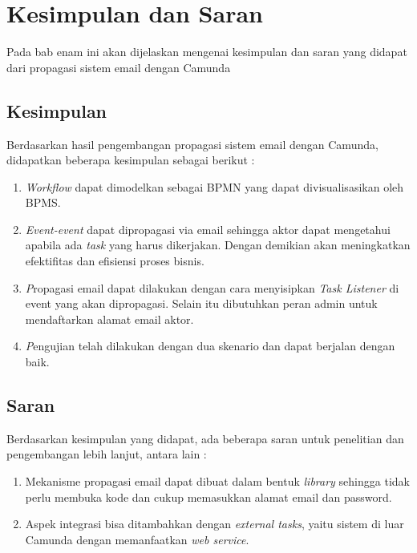 \chapter{Kesimpulan dan Saran}
\label{chap:kesimpulan_saran}
Pada bab enam ini akan dijelaskan mengenai kesimpulan dan saran yang didapat dari propagasi sistem email dengan Camunda 
\section{Kesimpulan}
\label{sec:kesimpulan}
Berdasarkan hasil pengembangan propagasi sistem email dengan Camunda, didapatkan beberapa kesimpulan sebagai berikut :
\begin{enumerate}
	\item \textit{Workflow} dapat dimodelkan sebagai BPMN yang dapat divisualisasikan oleh BPMS. 
	\item \textit{Event-event} dapat dipropagasi via email sehingga aktor dapat mengetahui apabila ada \textit{task} yang harus dikerjakan. Dengan demikian akan meningkatkan efektifitas dan efisiensi proses bisnis.
	\item \textit Propagasi email dapat dilakukan dengan cara menyisipkan \textit{Task Listener} di event yang akan dipropagasi. Selain itu dibutuhkan peran admin untuk mendaftarkan alamat email aktor.
	\item \textit Pengujian telah dilakukan dengan dua skenario dan dapat berjalan dengan baik.
	

\end{enumerate}

\section{Saran}
\label{sec:saran}
Berdasarkan kesimpulan yang didapat, ada beberapa saran untuk penelitian dan pengembangan lebih lanjut, antara lain :
\begin{enumerate}
	\item Mekanisme propagasi email dapat dibuat dalam bentuk \textit{library} sehingga tidak perlu membuka kode dan cukup memasukkan alamat email dan password.
	\item Aspek integrasi bisa ditambahkan dengan \textit{external tasks}, yaitu sistem di luar Camunda dengan memanfaatkan \textit{web service}.
\end{enumerate}